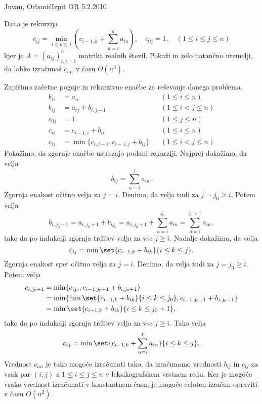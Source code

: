 \begin{naloga}{Juvan, Orbanić}{Izpit OR 5.2.2010}
\begin{vprasanje}
Dana je rekurzija
$$
c_{ij} = \min_{i \le k \le j} \left(c_{i-1,k} + \sum_{u=i}^k a_{iu}\right),
\quad c_{0j} = 1 , \quad (1 \le i \le j \le n)
$$
kjer je $A = (a_{ij})_{i,j=1}^n$ matrika realnih števil.
Pokaži in zelo natančno utemelji,
da lahko izračunaš $c_{nn}$ v času $O(n^3)$.
\end{vprasanje}

\begin{odgovor}
Zapišimo začetne pogoje in rekurzivne enačbe za reševanje danega problema.
\begin{align*}
b_{ii} &= a_{ii} && (1 \le i \le n) \\
b_{ij} &= a_{ij} + b_{i,j-1} && (1 \le i < j \le n) \\[1ex]
c_{0j} &= 1 && (1 \le j \le n) \\
c_{ii} &= c_{i-1,i} + b_{ii} && (1 \le i \le n) \\
c_{ij} &= \min\{c_{i,j-1}, c_{i-1,j} + b_{ij}\} && (1 \le i < j \le n)
\end{align*}
Pokažimo, da zgornje enačbe ustrezajo podani rekurziji.
Najprej dokažimo, da velja
$$
b_{ij} = \sum_{u=i}^j a_{iu} .
$$
Zgornja enakost očitno velja za $j = i$.
Denimo, da velja tudi za $j = j_0 \ge i$.
Potem velja
$$
b_{i,j_0+1} = a_{i,j_0+1} + b_{ij_0} = a_{i,j_0+1} + \sum_{u=i}^{j_0} a_{iu}
= \sum_{u=i}^{j_0+1} a_{iu} ,
$$
tako da po indukciji zgornja trditev velja za vse $j \ge i$.
Nadalje dokažimo, da velja
$$
c_{ij} = \min\set{c_{i-1,k} + b_{ik}}{i \le k \le j} .
$$
Zgornja enakost spet očitno velja za $j = i$.
Denimo, da velja tudi za $j = j_0 \ge i$.
Potem velja
\begin{align*}
c_{i,j_0+1} &= \min\{c_{ij_0}, c_{i-1,j_0+1} + b_{i,j_0+1}\} \\
&= \min\{\min\set{c_{i-1,k} + b_{ik}}{i \le k \le j_0}, c_{i-1,j_0+1} + b_{i,j_0+1}\} \\
&= \min\set{c_{i-1,k} + b_{ik}}{i \le k \le j_0+1} ,
\end{align*}
tako da po indukciji zgornja trditev velja za vse $j \ge i$.
Tako velja
$$
c_{ij} = \min\set{c_{i-1,k} + \sum_{u=i}^k a_{iu}}{i \le k \le j} .
$$
Vrednost $c_{nn}$ je tako mogoče izračunati tako,
da izračunamo vrednosti $b_{ij}$ in $c_{ij}$
za vsak par $(i, j)$ z $1 \le i \le j \le n$
v leksikografskem vrstnem redu.
Ker je mogoče vsako vrednost izračunati v konstantnem času,
je mogoče celoten izračun opraviti v času $O(n^2)$.
\end{odgovor}
\end{naloga}
